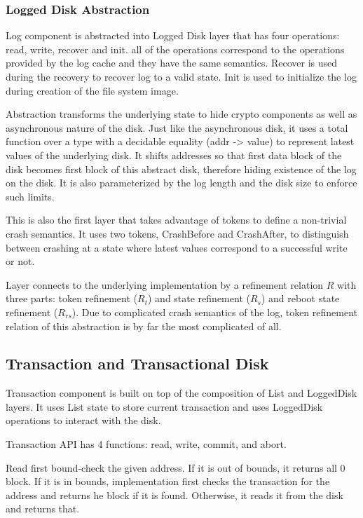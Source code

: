 \subsubsection{Logged Disk Abstraction}
Log component is abstracted into Logged Disk layer that has four operations: read, write, recover and init. all of the operations correspond to the operations provided by the log cache and they have the same semantics. Recover is used during the recovery to recover log to a valid state. Init is used to initialize the log during creation of the file system image.

Abstraction transforms the underlying state to hide crypto components as well as asynchronous nature of the disk. Just like the asynchronous disk, it uses a total function over a type with a decidable equality (addr -> value) to represent latest values of the underlying disk. It shifts addresses so that first data block of the disk becomes first block of this abstract disk, therefore hiding existence of the log on the disk. It is also parameterized by the log length and the disk size to enforce such limits.

This is also the first layer that takes advantage of tokens to define a non-trivial crash semantics. It uses two tokens, CrashBefore and CrashAfter, to distinguish between crashing at a state where latest values correspond to a successful write or not.

Layer connects to the underlying implementation by a refinement relation $R$ with three parts: token refinement ($R_t$) and state refinement ($R_s$) and reboot state refinement ($R_{rs}$). Due to complicated crash semantics of the log, token refinement relation of this abstraction is by far the most complicated of all.

\subsection{Transaction and Transactional Disk}
Transaction component is built on top of the composition of List and LoggedDisk layers.
It uses List state to store current transaction and uses LoggedDisk operations to interact with the disk.

Transaction API has 4 functions: read, write, commit, and abort.

Read first bound-check the given address. If it is out of bounds, it returns all 0 block. If it is in bounds, implementation first checks the transaction for the address and returns he block if it is found. Otherwise, it reads it from the disk and returns that.

